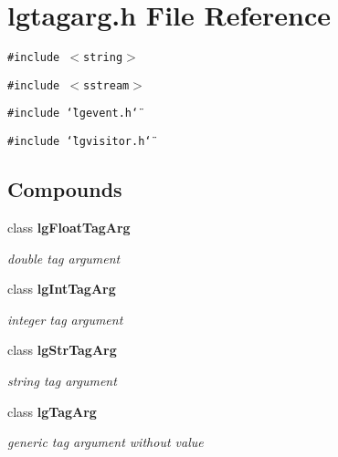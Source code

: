 \section{lgtagarg.h File Reference}
\label{lgtagarg_8h}
{\tt \#include $<$string$>$}\par
{\tt \#include $<$sstream$>$}\par
{\tt \#include \char`\"{}lgevent.h\char`\"{}}\par
{\tt \#include \char`\"{}lgvisitor.h\char`\"{}}\par
\subsection*{Compounds}
\begin{CompactItemize}
\item 
class {\bf lg\-Float\-Tag\-Arg}
\begin{CompactList}\small\item\em double tag argument \item\end{CompactList}\item 
class {\bf lg\-Int\-Tag\-Arg}
\begin{CompactList}\small\item\em integer tag argument \item\end{CompactList}\item 
class {\bf lg\-Str\-Tag\-Arg}
\begin{CompactList}\small\item\em string tag argument \item\end{CompactList}\item 
class {\bf lg\-Tag\-Arg}
\begin{CompactList}\small\item\em generic tag argument without value \item\end{CompactList}\end{CompactItemize}
